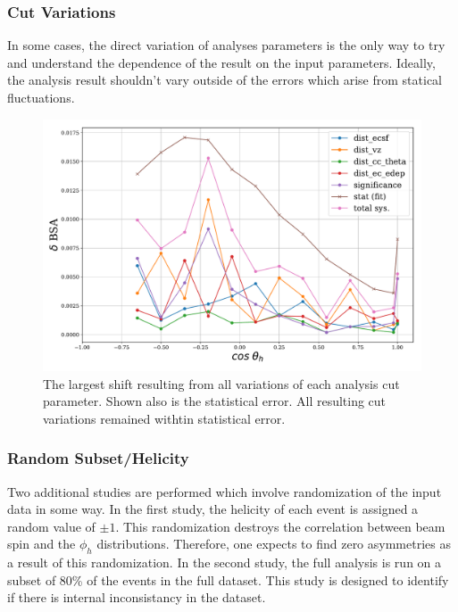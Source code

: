 \subsubsection{Cut Variations}
In some cases, the direct variation of analyses parameters is the only way to try and understand the dependence of the result on the input parameters.  Ideally, the analysis result shouldn't vary outside of the errors which arise from statical fluctuations.    

\begin{figure}
  \begin{center}
    \includegraphics[width=\columnwidth]{image/systematics.pdf}
    \caption{The largest shift resulting from all variations of each analysis cut parameter.  Shown also is the statistical error.  All resulting cut variations remained withtin statistical error.}
  \end{center}
\end{figure}

\subsubsection{Random Subset/Helicity}

Two additional studies are performed which involve randomization of the input data in some way.  In the first study, the helicity of each event is assigned a random value of $\pm 1$.  This randomization destroys the correlation between beam spin and the $\phi_h$ distributions.  Therefore, one expects to find zero asymmetries as a result of this randomization.  In the second study, the full analysis is run on a subset of 80\% of the events in the full dataset.  This study is designed to identify if there is internal inconsistancy in the dataset.
\\

